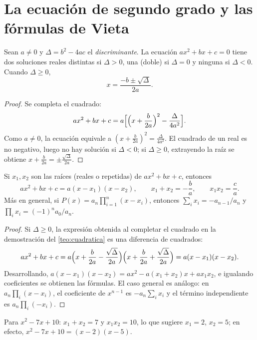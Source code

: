 \section{La ecuación de segundo grado y las fórmulas de Vieta}

\begin{teorema}\label{teo:cuadratica}
Sean $a\neq0$ y $\Delta=b^2-4ac$ el \emph{discriminante}. La ecuación $ax^2+bx+c=0$ tiene dos soluciones reales distintas si $\Delta>0$, una (doble) si $\Delta=0$ y ninguna si $\Delta<0$. Cuando $\Delta\ge0$,
\[
x=\frac{-b\pm\sqrt{\Delta}}{2a}.
\]
\end{teorema}

\begin{proof}
Se completa el cuadrado:
\[
ax^2+bx+c=a\Bigl[\Bigl(x+\frac{b}{2a}\Bigr)^2-\frac{\Delta}{4a^2}\Bigr].
\]
Como $a\neq0$, la ecuación equivale a $(x+\frac b{2a})^2=\frac{\Delta}{4a^2}$. El cuadrado de un real es no negativo, luego no hay solución si $\Delta<0$; si $\Delta\ge0$, extrayendo la raíz se obtiene $x+\frac b{2a}=\pm\frac{\sqrt\Delta}{2a}$.
\end{proof}

\begin{proposicion}\label{prop:vieta}
Si $x_1,x_2$ son las raíces (reales o repetidas) de $ax^2+bx+c$, entonces
\[
ax^2+bx+c=a(x-x_1)(x-x_2),\qquad x_1+x_2=-\frac ba,\qquad x_1x_2=\frac ca.
\]
Más en general, si $P(x)=a_n\prod_{i=1}^n(x-x_i)$, entonces $\sum_ix_i=-a_{n-1}/a_n$ y $\prod_ix_i=(-1)^na_0/a_n$.
\end{proposicion}

\begin{proof}
Si $\Delta\ge0$, la expresión obtenida al completar el cuadrado en la demostración del \cref{teo:cuadratica} es una diferencia de cuadrados:
\[
ax^2+bx+c=a\Bigl(x+\frac b{2a}-\frac{\sqrt\Delta}{2a}\Bigr)\Bigl(x+\frac b{2a}+\frac{\sqrt\Delta}{2a}\Bigr)=a(x-x_1)(x-x_2).
\]
Desarrollando, $a(x-x_1)(x-x_2)=ax^2-a(x_1+x_2)x+ax_1x_2$, e igualando coeficientes se obtienen las fórmulas. El caso general es análogo: en $a_n\prod_i(x-x_i)$, el coeficiente de $x^{n-1}$ es $-a_n\sum_ix_i$ y el término independiente es $a_n\prod_i(-x_i)$.
\end{proof}

\begin{ejemplo}
Para $x^2-7x+10$: $x_1+x_2=7$ y $x_1x_2=10$, lo que sugiere $x_1=2$, $x_2=5$; en efecto, $x^2-7x+10=(x-2)(x-5)$.
\end{ejemplo}

